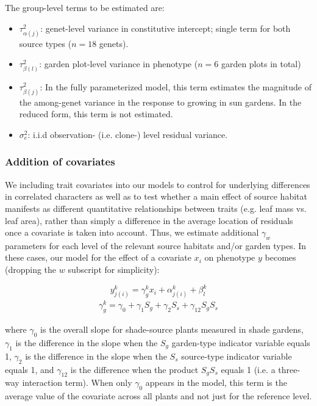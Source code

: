 \documentclass[11pt, oneside]{amsart}
\begin{document}
The group-level terms to be estimated are:
\begin{itemize}
\item $\tau^2_{\alpha(j)}$: genet-level variance in constitutive intercept; single term for both source types ($n = 18$ genets).
\item $\tau^2_{\beta(l)}$: garden plot-level variance in phenotype ($n=6$ garden plots in total)
\item $\tau^2_{\beta(j)}$: In the fully parameterized model, this term estimates the magnitude of the among-genet variance in the response to growing in sun gardens. In the reduced form, this term is not estimated.
\item $\sigma^2_{e}$: i.i.d observation- (i.e. clone-) level residual variance.
\end{itemize}

\subsubsection{Addition of covariates}

We including trait covariates into our models to control for underlying differences in correlated characters as well as to test whether a main effect of source habitat manifests as different quantitative relationships between traits (e.g. leaf mass vs. leaf area), rather than simply a difference in the average location of residuals once a covariate is taken into account. Thus, we estimate additional $\gamma_{w}$ parameters for each level of the relevant source habitats and/or garden types. In these cases, our model for the effect of a covariate $x_i$ on phenotype $y$ becomes (dropping the $w$ subscript for simplicity):


\begin{equation} \label{eq4}
y^{k}_{j(i)} = \gamma^{k}_{g} x_{i} + \alpha^{k}_{j(i)} + \beta^{k}_{l}
\end{equation}
\begin{align*}
\gamma^{k}_{g} = \gamma_{0} + \gamma_{1}S_{g} + \gamma_{2}S_{s} + \gamma_{12}S_{g}S_{s}
\end{align*}

where $\gamma_{0}$ is the overall slope for shade-source plants measured in shade gardens, $\gamma_{1}$ is the difference in the slope when the $S_{g}$ garden-type indicator variable equals 1, $\gamma_{2}$ is the difference in the slope when the $S_s$ source-type indicator variable equals 1, and $\gamma_{12}$ is the difference when the product $S_{g}S_{s}$ equals 1 (i.e. a three-way interaction term). When only $\gamma_0$ appears in the model, this term is the average value of the covariate across all plants and not just for the reference level.
\end{document}
